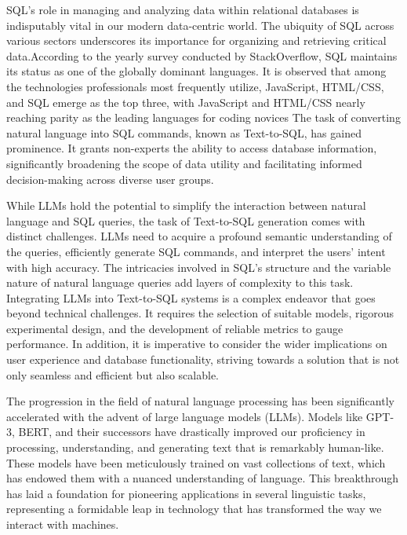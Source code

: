 \documentclass[a4paper,oneside]{book}
\begin{document}
SQL's role in managing and analyzing data within relational databases is indisputably vital in our modern data-centric world. The ubiquity of SQL across various sectors underscores its importance for organizing and retrieving critical data.According to the yearly survey conducted by StackOverflow, SQL maintains its status as one of the globally dominant languages. It is observed that among the technologies professionals most frequently utilize, JavaScript, HTML/CSS, and SQL emerge as the top three, with JavaScript and HTML/CSS nearly reaching parity as the leading languages for coding novices
The task of converting natural language into SQL commands, known as Text-to-SQL, has gained prominence. It grants non-experts the ability to access database information, significantly broadening the scope of data utility and facilitating informed decision-making across diverse user groups.

While LLMs hold the potential to simplify the interaction between natural language and SQL queries, the task of Text-to-SQL generation comes with distinct challenges. LLMs need to acquire a profound semantic understanding of the queries, efficiently generate SQL commands, and interpret the users' intent with high accuracy. The intricacies involved in SQL's structure and the variable nature of natural language queries add layers of complexity to this task. Integrating LLMs into Text-to-SQL systems is a complex endeavor that goes beyond technical challenges. It requires the selection of suitable models, rigorous experimental design, and the development of reliable metrics to gauge performance. In addition, it is imperative to consider the wider implications on user experience and database functionality, striving towards a solution that is not only seamless and efficient but also scalable.

The progression in the field of natural language processing has been significantly accelerated with the advent of large language models (LLMs). Models like GPT-3, BERT, and their successors have drastically improved our proficiency in processing, understanding, and generating text that is remarkably human-like. These models have been meticulously trained on vast collections of text, which has endowed them with a nuanced understanding of language. This breakthrough has laid a foundation for pioneering applications in several linguistic tasks, representing a formidable leap in technology that has transformed the way we interact with machines.
\end{document}
